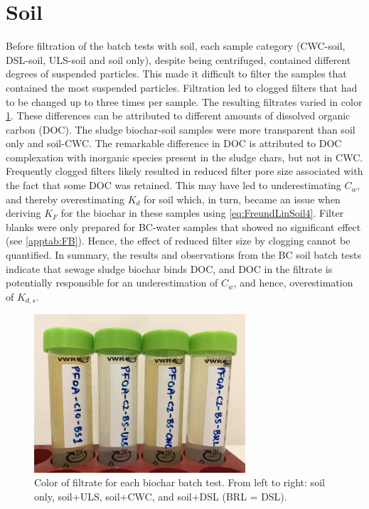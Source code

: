 \section{Soil}\label{sec:Soil}
Before filtration of the batch tests with soil, each sample category (CWC-soil, DSL-soil, ULS-soil and soil only), despite being centrifuged, contained different degrees of suspended particles. This made it difficult to filter the samples that contained the most suspended particles. Filtration led to clogged filters that had to be changed up to three times per sample. The resulting filtrates varied in color \cref{fig:DOC}. These differences can be attributed to different amounts of dissolved organic carbon (\acrshort{DOC}). The sludge biochar-soil samples were more transparent than soil only and soil-CWC. The remarkable difference in DOC is attributed to DOC complexation with inorganic species present in the sludge chars, but not in CWC. Frequently clogged filters likely resulted in reduced filter pore size associated with the fact that some DOC was retained. This may have led to underestimating $C_w$, and thereby overestimating $K_d$ for soil which, in turn, became an issue when deriving $K_F$ for the biochar in these samples using \cref{eq:FreundLinSoil4}. Filter blanks were only prepared for BC-water samples that showed no significant effect (see \cref{apptab:FB}). Hence, the effect of reduced filter size by clogging cannot be quantified. In summary, the results and observations from the BC soil batch tests indicate that sewage sludge biochar binds DOC, and DOC in the filtrate is potentially responsible for an underestimation of $C_w$, and hence, overestimation of $K_{d,s}$. 

\begin{figure}
    \centering
    \includegraphics[width=0.7\textwidth]{Bilder/Samples/Filtrate_DOC.JPG}
    \caption{Color of filtrate for each biochar batch test. From left to right: soil only, soil+ULS, soil+CWC, and soil+DSL (BRL = DSL).}
    \label{fig:DOC}
\end{figure}

